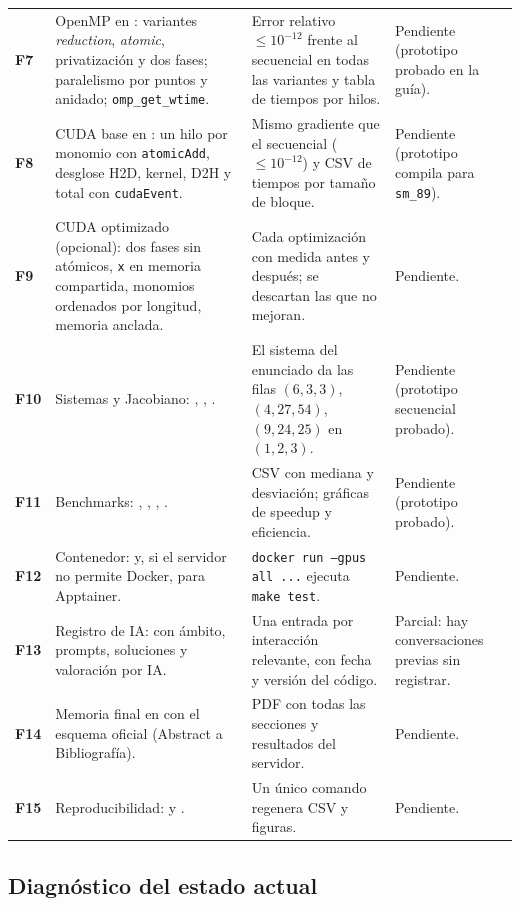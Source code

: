 {\begin{xltabular}{\linewidth}{@{}>{\bfseries}p{0.8cm} >{\raggedright\arraybackslash}p{4.6cm} >{\raggedright\arraybackslash}X >{\raggedright\arraybackslash}p{2.3cm}@{}}
F7 & OpenMP en : variantes \emph{reduction}, \emph{atomic}, privatización y dos fases; paralelismo por puntos y anidado; \texttt{omp\_get\_wtime}. & Error relativo $\le 10^{-12}$ frente al secuencial en todas las variantes y tabla de tiempos por hilos. & Pendiente (prototipo probado en la guía). \\
F8 & CUDA base en : un hilo por monomio con \texttt{atomicAdd}, desglose H2D, kernel, D2H y total con \texttt{cudaEvent}. & Mismo gradiente que el secuencial ($\le 10^{-12}$) y CSV de tiempos por tamaño de bloque. & Pendiente (prototipo compila para \texttt{sm\_89}). \\
F9 & CUDA optimizado (opcional): dos fases sin atómicos, \texttt{x} en memoria compartida, monomios ordenados por longitud, memoria anclada. & Cada optimización con medida antes y después; se descartan las que no mejoran. & Pendiente. \\
F10 & Sistemas y Jacobiano: , , . & El sistema del enunciado da las filas $(6,3,3)$, $(4,27,54)$, $(9,24,25)$ en $(1,2,3)$. & Pendiente (prototipo secuencial probado). \\
F11 & Benchmarks: , , , . & CSV con mediana y desviación; gráficas de speedup y eficiencia. & Pendiente (prototipo probado). \\
F12 & Contenedor:  y, si el servidor no permite Docker,  para Apptainer. & \texttt{docker run --gpus all ...} ejecuta \texttt{make test}. & Pendiente. \\
F13 & Registro de IA:  con ámbito, prompts, soluciones y valoración por IA. & Una entrada por interacción relevante, con fecha y versión del código. & Parcial: hay conversaciones previas sin registrar. \\
F14 & Memoria final en  con el esquema oficial (Abstract a Bibliografía). & PDF con todas las secciones y resultados del servidor. & Pendiente. \\
F15 & Reproducibilidad:  y . & Un único comando regenera CSV y figuras. & Pendiente. \\
\end{xltabular}
}

\subsection{Diagnóstico del estado actual}\label{sec:diagnostico}


